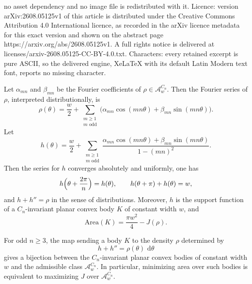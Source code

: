 \documentclass[10pt,a4paper]{amsart}
\providecommand{\Area}{\mathrm{Area}}
\newcommand{\dd}{\,\mathrm{d}}
\begin{document}
no asset dependency and no image file is redistributed with it. Licence: version arXiv:2608.05125v1 of this article is distributed under the Creative Commons Attribution 4.0 International licence, as recorded in the arXiv licence metadata for this exact version and shown on the abstract page https://arxiv.org/abs/2608.05125v1. A full rights notice is delivered at licenses/arxiv-2608.05125-CC-BY-4.0.txt. Characters: every retained excerpt is pure ASCII, so the delivered engine, XeLaTeX with its default Latin Modern text font, reports no missing character.
\begin{lemma}
\label{lem:reconstruct-rho}
Let $\alpha_{mn}$ and $\beta_{mn}$ be the Fourier coefficients of $\rho\in\mathcal A_w^{C_n}$. Then the Fourier series of $\rho$, interpreted distributionally, is
\[
\rho(\theta)=\frac w2+\sum_{\substack{m\ge1\\m\text{ odd}}}
\bigl(\alpha_{mn}\cos(mn\theta)+\beta_{mn}\sin(mn\theta)\bigr).
\]
Let
\[
h(\theta)=\frac w2+\sum_{\substack{m\ge1\\m\text{ odd}}}
\frac{\alpha_{mn}\cos(mn\theta)+\beta_{mn}\sin(mn\theta)}{1-(mn)^2}.
\]
Then the series for $h$ converges absolutely and uniformly, one has
\[
h\Bigl(\theta+\frac{2\pi}{n}\Bigr)=h(\theta),
\qquad
h(\theta+\pi)+h(\theta)=w,
\]
and $h+h''=\rho$ in the sense of distributions. Moreover, $h$ is the support function of a $C_n$-invariant planar convex body $K$ of constant width $w$, and
\begin{equation} \label{Area}
    \Area(K)=\frac{\pi w^2}{4}-J(\rho).
\end{equation}


\end{lemma}

\begin{corollary}
\label{cor:no-relaxation}
For odd $n\ge3$, the map sending a body $K$ to the density $\rho$ determined by
\[
h+h''=\rho(\theta)\,\dd\theta
\]
gives a bijection between the $C_n$-invariant planar convex bodies of constant width $w$ and the admissible class $\mathcal A_w^{C_n}$. In particular, minimizing area over such bodies is equivalent to maximizing $J$ over $\mathcal A_w^{C_n}$.
\end{corollary}
\end{document}
